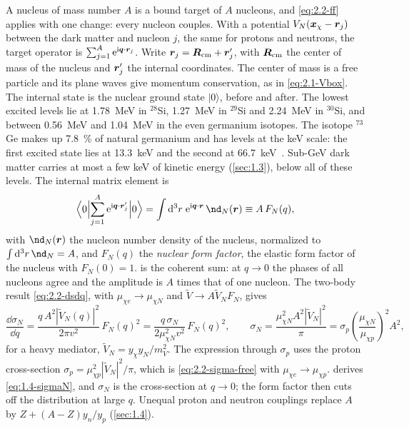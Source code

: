 A nucleus of mass number $A$ is a bound target of $A$ nucleons, and \cref{eq:2.2-ff} applies with one change: every nucleon couples. With a potential $V_N(\bm{x}_\chi - \bm{r}_j)$ between the dark matter and nucleon $j$, the same for protons and neutrons, the target operator is $\sum_{j=1}^A\mathrm{e}^{\mathrm{i}\bm{q}\cdot\bm{r}_j}$. Write $\bm{r}_j = \bm{R}_{\mathrm{cm}} + \bm{r}'_j$, with $\bm{R}_{\mathrm{cm}}$ the center of mass of the nucleus and $\bm{r}'_j$ the internal coordinates. The center of mass is a free particle and its plane waves give momentum conservation, as in \cref{eq:2.1-Vbox}. The internal state is the nuclear ground state $|0\rangle$, before and after. The lowest excited levels lie at \SI{1.78}{MeV} in $^{28}$Si, \SI{1.27}{MeV} in $^{29}$Si and \SI{2.24}{MeV} in $^{30}$Si, and between \SI{0.56}{MeV} and \SI{1.04}{MeV} in the even germanium isotopes. The isotope $^{73}$Ge makes up \SI{7.8}{\percent} of natural germanium and has levels at the keV scale: the first excited state lies at \SI{13.3}{keV} and the second at \SI{66.7}{keV}~\cite{iaea2026livechart}. Sub-GeV dark matter carries at most a few keV of kinetic energy (\cref{sec:1.3}), below all of these levels. The internal matrix element is
\begin{equation}
  \Bigl\langle 0\Bigl|\sum_{j=1}^A\ee^{\ii\vect{q}\cdot\vect{r}'_j}\Bigr|0\Bigr\rangle = \int\dd^3r\;\ee^{\ii\vect{q}\cdot\vect{r}}\,\nd_N(\vect{r}) \equiv A\,F_N(q) ,
  \label{eq:2.2-FN}
\end{equation}
with $\nd_N(\vect{r})$ the nucleon number density of the nucleus, normalized to $\int\dd^3r\,\nd_N = A$, and $F_N(q)$ the \emph{nuclear form factor}, the elastic form factor of the nucleus with $F_N(0) = 1$.  is the coherent sum: at $q \to 0$ the phases of all nucleons agree and the amplitude is $A$ times that of one nucleon. The two-body result \cref{eq:2.2-dsdq}, with $\mu_{\chi e} \to \mu_{\chi N}$ and $\tilde V \to A\tilde V_N F_N$, gives
\begin{equation}
  \frac{\dd\sigma_N}{\dd q} = \frac{q\,A^2|\tilde V_N(q)|^2}{2\pi v^2}\,F_N(q)^2
  = \frac{q\,\sigma_N}{2\mu_{\chi N}^2v^2}\,F_N(q)^2 , \qquad
  \sigma_N = \frac{\mu_{\chi N}^2A^2|\tilde V_N|^2}{\pi} = \sigma_p\left(\frac{\mu_{\chi N}}{\mu_{\chi p}}\right)^2A^2 ,
  \label{eq:2.2-nucleus}
\end{equation}
for a heavy mediator, $\tilde V_N = y_\chi y_N/m_V^2$. The expression through $\sigma_p$ uses the proton cross-section $\sigma_p = \mu_{\chi p}^2|\tilde V_N|^2/\pi$, which is \cref{eq:2.2-sigma-free} with $\mu_{\chi e} \to \mu_{\chi p}$.  derives \cref{eq:1.4-sigmaN}, and $\sigma_N$ is the cross-section at $q \to 0$; the form factor then cuts off the distribution at large $q$. Unequal proton and neutron couplings replace $A$ by $Z + (A - Z)y_n/y_p$ (\cref{sec:1.4}).

